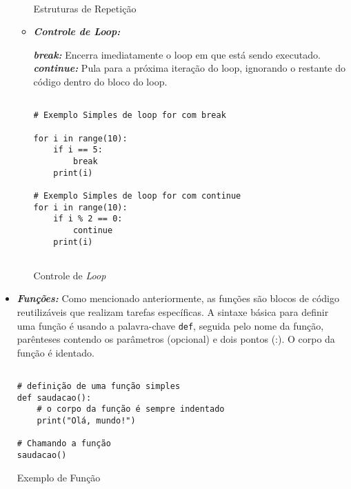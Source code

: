 \documentclass[a4paper, 12pt, onecolumn,singlespacing]{article}
\begin{document}
\begin{itemize}
\begin{itemize}
\begin{listing}[!ht]
\begin{verbatim}
	
\end{verbatim}
\label{exemplo_estruturas_de_repeticao}
\caption{Estruturas de Repetição}
\end{listing}
	\item \textbf{\textit{Controle de Loop:}}
	
	\subitem \textbf{\textit{break:}} Encerra imediatamente o loop em que está sendo executado.
	\subitem \textbf{\textit{continue:}} Pula para a próxima iteração do loop, ignorando o restante do código dentro do bloco do loop.
	\pagebreak
\begin{listing}[!ht]
	\begin{verbatim}

# Exemplo Simples de loop for com break

for i in range(10):
	if i == 5:
		break
	print(i)

# Exemplo Simples de loop for com continue
for i in range(10):
	if i % 2 == 0:
		continue
	print(i)
		
	\end{verbatim}
	\label{exemplo_estruturas_de_controle_de_loop}
	\caption{Controle de \textit{Loop}}
\end{listing}
	
	\end{itemize}
	\item \textbf{\textit{Funções:}} Como mencionado anteriormente, as funções são blocos de código reutilizáveis que realizam tarefas específicas. A sintaxe básica para definir uma função é usando a palavra-chave \texttt{def}, seguida pelo nome da função, parênteses contendo os parâmetros (opcional) e dois pontos (:). O corpo da função é identado.
	
	\begin{listing}[!ht]
		\begin{verbatim}
			
# definição de uma função simples		
def saudacao():
	# o corpo da função é sempre indentado
	print("Olá, mundo!")

# Chamando a função
saudacao()

		\end{verbatim}
		\label{exemplo_funcoes}
		\caption{Exemplo de Função}
	\end{listing}
	
	\end{itemize}
\end{document}
